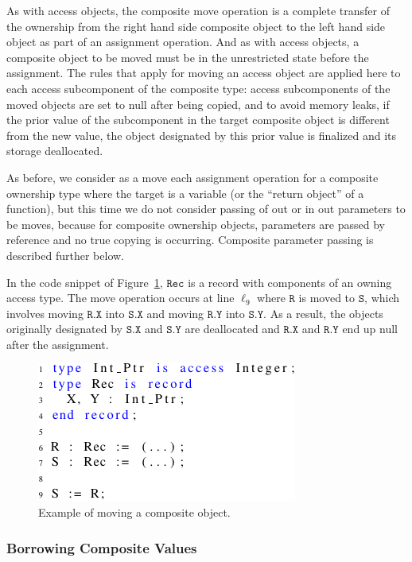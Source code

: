 \documentclass{llncs}
\newcommand\var[1]{\ensuremath{\mathtt{#1}}}
\newcommand{\keyword}[1]{\textsf{#1}}
\begin{document}
As with access objects, the composite move operation is a complete transfer of the ownership from the right hand side composite object to the left hand
side object as part of an assignment operation. And as with access objects, a composite object to be moved must be in the unrestricted state before the assignment. The rules that apply for moving an
access object are applied here to each access subcomponent of the composite type: access subcomponents of the moved objects are set to null after being copied, and to avoid memory leaks, if the
prior value of the subcomponent in the target composite object is different from the new value, the object designated by this prior value is finalized and its storage deallocated.

As before, we consider as a move each assignment operation for a composite ownership type where the target is a variable (or the ``return object'' of a function), but this time we do not
consider passing of \keyword{out} or \keyword{in out} parameters to be moves, because for composite ownership objects, parameters are passed by reference and no true copying is occurring. Composite parameter passing is described further below.

In the code snippet of Figure~\ref{fig:movingComposite}, \var{Rec} is a record with components of an owning access type. The move operation occurs at line $\ell_{9}$ where \var{R} is moved
to \var{S}, which involves moving \var{R.X} into \var{S.X} and moving \var{R.Y} into \var{S.Y}. As a result, the objects originally designated by
\var{S.X} and \var{S.Y} are deallocated and \var{R.X} and \var{R.Y} end up null after the assignment.


\begin{figure}[htb!]
\centering
   \includegraphics[]{movingComposite}
   \caption{Example of moving a composite object.}
   \label{fig:movingComposite}
\end{figure}

\subsubsection{Borrowing Composite Values}
\label{subsubsec:borrowComposite}
\end{document}
